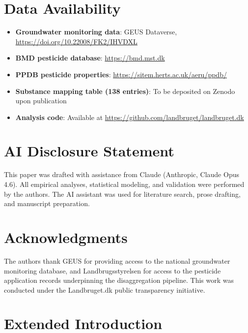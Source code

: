 \documentclass[12pt,a4paper]{article}
\begin{document}
\section*{Data Availability}

\begin{itemize}
\item \textbf{Groundwater monitoring data}: GEUS Dataverse, \url{https://doi.org/10.22008/FK2/IHVDXL}
\item \textbf{BMD pesticide database}: \url{https://bmd.mst.dk}
\item \textbf{PPDB pesticide properties}: \url{https://sitem.herts.ac.uk/aeru/ppdb/}
\item \textbf{Substance mapping table (138 entries)}: To be deposited on Zenodo upon publication
\item \textbf{Analysis code}: Available at \url{https://github.com/landbruget/landbruget.dk}
\end{itemize}

\section*{AI Disclosure Statement}

This paper was drafted with assistance from Claude (Anthropic, Claude Opus 4.6). All empirical analyses, statistical modeling, and validation were performed by the authors. The AI assistant was used for literature search, prose drafting, and manuscript preparation.

\section*{Acknowledgments}

The authors thank GEUS for providing access to the national groundwater monitoring database, and Landbrugsstyrelsen for access to the pesticide application records underpinning the disaggregation pipeline. This work was conducted under the Landbruget.dk public transparency initiative.

\clearpage
\appendix
\renewcommand{\thesection}{S\arabic{section}}
\setcounter{section}{0}

\section{Extended Introduction}
\end{document}
